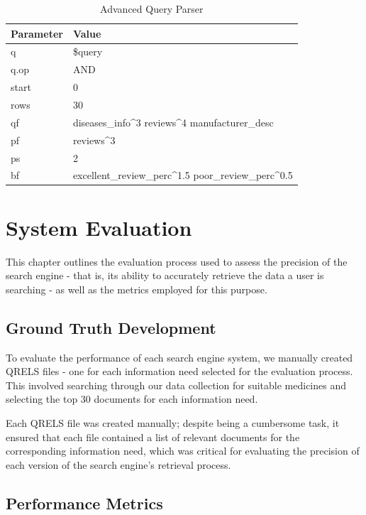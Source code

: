 \documentclass[sigconf]{acmart}
\begin{document}
\begin{table}[H]
    \begin{tabular}{ll}
    \toprule
    Parameter & Value\\
    \midrule
    q & \$query\\
    q.op & AND\\
    start & 0\\
    rows & 30\\
    qf & diseases\_info\^{}3 reviews\^{}4 manufacturer\_desc\\
    pf & reviews\^{}3\\
    ps & 2\\
    bf & excellent\_review\_perc\^{}1.5 poor\_review\_perc\^{}0.5\\
    \bottomrule
    \end{tabular}
    \caption{Advanced Query Parser}
    \label{tab:advanced_query}
\end{table}

\section{System Evaluation}

This chapter outlines the evaluation process used to assess the precision of the search engine - that is, its ability to accurately retrieve the data a user is searching - as well as the metrics employed for this purpose.

\subsection{Ground Truth Development}

To evaluate the performance of each search engine system, we manually created QRELS\cite{qrels} files - one for each information need selected for the evaluation process. This involved searching through our data collection for suitable medicines and selecting the top 30 documents for each information need.

Each QRELS file was created manually; despite being a cumbersome task, it ensured that each file contained a list of relevant documents for the corresponding information need, which was critical for evaluating the precision of each version of the search engine's retrieval process.

\subsection{Performance Metrics}
\end{document}
